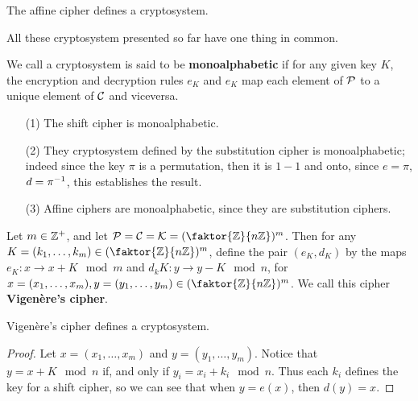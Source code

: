 \begin{lemma}\label{1.1.7}
    The affine cipher defines a cryptosystem.
\end{lemma}

All these cryptosystem presented so far have one thing in common.

\begin{definition}
    We call a cryptosystem is said to be \textbf{monoalphabetic} if for any
    given key $K$, the encryption and decryption rules  $e_K$ and  $e_K$ map
    each element of  $\mathcal{P}$ to a unique element of $\mathcal{C}$ and viceversa.
\end{definition}

\begin{example}
    \begin{enumerate}
        \item[(1)] The shift cipher is monoalphabetic.

        \item[(2)] They cryptosystem defined by the substitution cipher is
            monoalphabetic; indeed since the key $\pi$ is a permutation, then it
            is  $1-1$ and onto, since  $e=\pi$,  $d=\pi^{-1}$, this establishes
            the result.

        \item[(3)] Affine ciphers are monoalphabetic, since they are
            substitution ciphers.
    \end{enumerate}
\end{example}

\begin{definition}
    Let $m \in \mathbb{Z}^+$, and let  $\Pc=\Cc=\Kc=(\faktor{\Z}{n\Z})^m$. Then for any
    $K=(k_1, \dots, k_m) \in (\faktor{\Z}{n\Z})^m$, define the pair $(e_K,d_K)$
    by the maps $e_K:x \rightarrow x+K \mod{m}$ and $d_kK:y \rightarrow y-K
    \mod{n}$, for $x=(x_1, \dots, x_m), y=(y_1, \dots, y_m) \in
    (\faktor{\Z}{n\Z})^m$. We call this cipher \textbf{Vigen\`ere's cipher}.
\end{definition}

\begin{theorem}\label{1.1.8}
    Vigen\`ere's cipher defines a cryptosystem.
\end{theorem}
\begin{proof}
    Let $x=(x_1, \dots, x_m)$ and $y=(y_1, \dots, y_m)$. Notice that $y=x+K
    \mod{n}$ if, and only if $y_i=x_i+k_i \mod{n}$. Thus each $k_i$ defines the
    key for a shift cipher, so we can see that when $y=e(x)$, then $d(y)=x$.
\end{proof}

